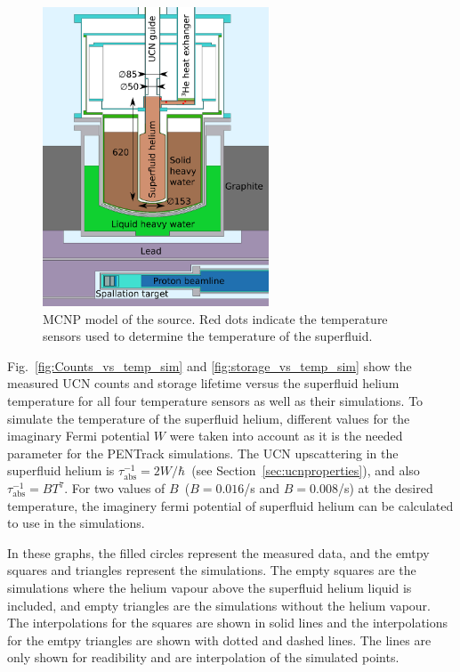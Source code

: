 \begin{figure}[h!]
  \centering
  \includegraphics[width=0.6\textwidth]{MCNPmodel.pdf}
  \caption{MCNP model of the source. Red dots indicate the temperature
    sensors used to determine the temperature of the superfluid.}
  \label{fig:mcnpmodel}
\end{figure}


Fig.~\ref{fig:Counts_vs_temp_sim} and \ref{fig:storage_vs_temp_sim}
show the measured UCN counts and storage lifetime versus the
superfluid helium temperature for all four temperature sensors as well
as their simulations. To simulate the temperature of the superfluid
helium, different values for the imaginary Fermi potential $W$ were
taken into account as it is the needed parameter for the PENTrack
simulations. The UCN upscattering in the superfluid helium is
$\tau_{\mathrm{abs}}^{-1} = 2W/\hbar$~(see
Section~\ref{sec:ucnproperties}), and also
$\tau_{\mathrm{abs}}^{-1} = B T^7$. For two values of
$B$~($B = 0.016$/s and $B = 0.008$/s) at the desired temperature, the
imaginery fermi potential of superfluid helium can be calculated to
use in the simulations.



In these graphs, the filled circles represent the
measured data, and the emtpy squares and triangles represent the
simulations.  The empty squares are the simulations where the helium
vapour above the superfluid helium liquid is included, and empty
triangles are the simulations without the helium vapour. The
interpolations for the squares are shown in solid lines and the
interpolations for the emtpy triangles are shown with dotted and dashed
lines. The lines are only shown for readibility and are interpolation
of the simulated points.



